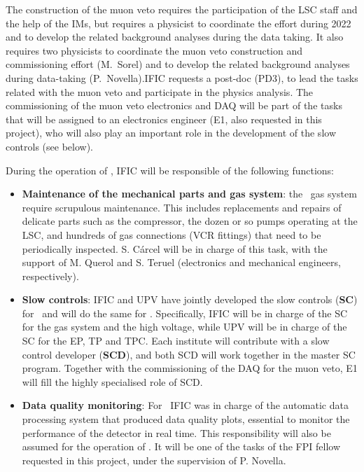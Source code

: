 The construction of the muon veto requires the participation of the LSC staff and the help of the IMs, but requires a physicist to coordinate the effort during 2022 and to develop the related background analyses during the data taking. It also requires two physicists to coordinate the muon veto construction and commissioning effort  (M.~Sorel) and to develop the related background analyses during data-taking (P.~Novella).IFIC requests a post-doc (PD3), to lead the tasks related with the muon veto and participate in the physics analysis. The commissioning of the muon veto electronics and DAQ will  be part of the tasks that will be assigned to an electronics engineer (E1, also requested in this project), who will also play an important role in the development of the slow controls (see below). 

During the operation of \Next, IFIC will be responsible of the following functions:

\begin{itemize}[noitemsep,topsep=0pt,parsep=0pt,partopsep=0pt]
    \item {\bf Maintenance of the mechanical parts and gas system}:  the \Next\ gas system require scrupulous maintenance. This includes replacements and repairs of delicate parts such as the compressor, the dozen or so pumps operating at the LSC, and hundreds of gas connections (VCR fittings) that need to be periodically inspected. S. C\'arcel will be in charge of this task, with the support of M. Querol and S. Teruel (electronics and mechanical engineers, respectively).
    \item {\bf Slow controls}: IFIC and UPV have jointly developed the slow controls ({\bf SC}) for \NEW\ and will do the same for \Next. Specifically, IFIC will be in charge of the SC for the gas system and the high voltage, while UPV will be in charge of the SC for the EP, TP and TPC. Each institute will contribute with a slow control developer ({\bf SCD}), and both SCD will work together in the master SC program. Together with the commissioning of the DAQ for the muon veto, E1 will fill the highly specialised role of SCD.  
    \item {\bf Data quality monitoring}: For \NEW\ IFIC was in charge of the automatic data processing system that produced data quality plots, essential to monitor the performance of the detector in real time. This responsibility will also be assumed for the operation of \Next. It will be one of the tasks of the FPI fellow requested in this project, under the supervision of P. Novella.   
\end{itemize}

